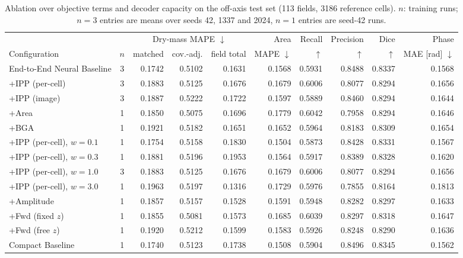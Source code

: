 \begin{table}[!htbp]
\centering
\caption{Ablation over objective terms and decoder capacity on the off-axis
test set (113 fields, 3186 reference cells). $n$: training runs; $n=3$
entries are means over seeds 42, 1337 and 2024, $n=1$ entries are seed-42 runs.}
\label{tab:ablation}
\scriptsize
\begin{tabular*}{\textwidth}{@{\extracolsep{\fill}}lcrrrrrrrr@{}}
\toprule
 & & \multicolumn{3}{c}{Dry-mass MAPE $\downarrow$} & Area & Recall & Precision & Dice & Phase \\
\cmidrule(lr){3-5}
Configuration & $n$ & matched & cov.-adj. & field total & MAPE $\downarrow$ & $\uparrow$ & $\uparrow$ & $\uparrow$ & MAE [rad] $\downarrow$ \\
\midrule
End-to-End Neural Baseline & 3 & 0.1742 & 0.5102 & 0.1631 & 0.1568 & 0.5931 & 0.8488 & 0.8337 & 0.1568 \\
\midrule
+IPP (per-cell) & 3 & 0.1883 & 0.5125 & 0.1676 & 0.1679 & 0.6006 & 0.8077 & 0.8294 & 0.1656 \\
+IPP (image) & 3 & 0.1887 & 0.5222 & 0.1722 & 0.1597 & 0.5889 & 0.8460 & 0.8294 & 0.1644 \\
+Area & 1 & 0.1850 & 0.5075 & 0.1696 & 0.1779 & 0.6042 & 0.7958 & 0.8294 & 0.1646 \\
+BGA & 1 & 0.1921 & 0.5182 & 0.1651 & 0.1652 & 0.5964 & 0.8183 & 0.8309 & 0.1654 \\
\midrule
+IPP (per-cell), $w=0.1$ & 1 & 0.1754 & 0.5158 & 0.1830 & 0.1504 & 0.5873 & 0.8428 & 0.8331 & 0.1567 \\
+IPP (per-cell), $w=0.3$ & 1 & 0.1881 & 0.5196 & 0.1953 & 0.1564 & 0.5917 & 0.8389 & 0.8328 & 0.1620 \\
+IPP (per-cell), $w=1.0$ & 3 & 0.1883 & 0.5125 & 0.1676 & 0.1679 & 0.6006 & 0.8077 & 0.8294 & 0.1656 \\
+IPP (per-cell), $w=3.0$ & 1 & 0.1963 & 0.5197 & 0.1316 & 0.1729 & 0.5976 & 0.7855 & 0.8164 & 0.1813 \\
\midrule
+Amplitude & 1 & 0.1857 & 0.5157 & 0.1528 & 0.1591 & 0.5948 & 0.8282 & 0.8297 & 0.1633 \\
+Fwd (fixed $z$) & 1 & 0.1855 & 0.5081 & 0.1573 & 0.1685 & 0.6039 & 0.8297 & 0.8318 & 0.1647 \\
+Fwd (free $z$) & 1 & 0.1920 & 0.5212 & 0.1599 & 0.1583 & 0.5926 & 0.8248 & 0.8290 & 0.1636 \\
\midrule
Compact Baseline & 1 & 0.1740 & 0.5123 & 0.1738 & 0.1508 & 0.5904 & 0.8496 & 0.8345 & 0.1562 \\

\end{tabular*}
\end{table}
